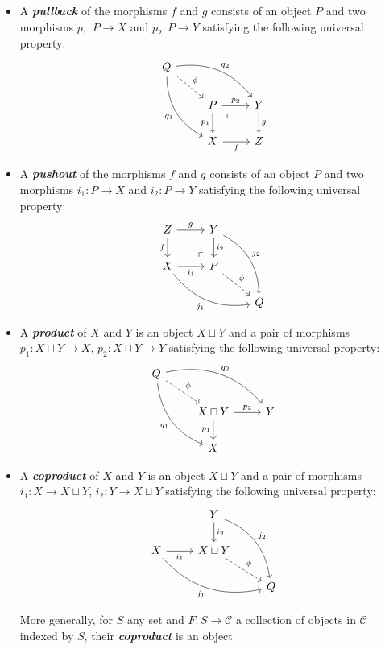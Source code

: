 \documentclass{article}
\numberwithin{equation}{section}
\newcommand{\Cc}{\mathcal{C}}
\begin{document}
\begin{defn}
\begin{itemize}
		\item A \textbf{\textit{pullback}} of the morphisms $f$ and $g$ consists of an object $P$ and two morphisms $p_1:P\to X$ and $p_2:P\to Y$ satisfying the following universal property:
		\[\begin{tikzcd}
			Q\arrow[rrd,bend left,"q_2"]\arrow[ddr,"q_1",swap,bend right]\arrow[dr,dashed,"\phi"]\\
			&P\arrow[r,"p_2"] \arrow[rd, phantom, "\lrcorner", very near start]\arrow[d,"p_1",swap]&Y\arrow[d,"g"]\\
			&X\arrow[r,"f",swap]&Z
		\end{tikzcd}\]
		\item A \textbf{\textit{pushout}} of the morphisms $f$ and $g$ consists of an object $P$ and two morphisms $i_1:P\to X$ and $i_2:P\to Y$ satisfying the following universal property:
		\[\begin{tikzcd}
			Z\arrow[r,"g"]\arrow[d,swap,"f"]&Y\arrow[d,"i_2"]\arrow[ddr,bend left,"j_2"]\\
			X\arrow[r,"i_1",swap]\arrow[drr,bend right,swap,"j_1"]&P\arrow[ul, phantom, "\ulcorner", very near start]\arrow[dr,dashed,"\phi"]\\
			&&Q
		\end{tikzcd}\]
		\item A \textbf{\textit{product}} of $X$ and $Y$ is an object $X\sqcup Y$ and a pair of morphisms $p_1:X\sqcap Y\to X$, $p_2:X\sqcap Y\to Y$ satisfying the following universal property:
		\[\begin{tikzcd}
			Q\arrow[rrd,bend left,"q_2"]\arrow[ddr,"q_1",swap,bend right]\arrow[dr,dashed,"\phi"]\\
			&X\sqcap Y\arrow[r,"p_2"]\arrow[d,"p_1",swap]&Y\\
			&X
		\end{tikzcd}\]
		\item A \textbf{\textit{coproduct}} of $X$ and $Y$ is an object $X\sqcup Y$ and a pair of morphisms $i_1:X\to X\sqcup Y$, $i_2:Y\to X\sqcup Y$ satisfying the following universal property:
		\[\begin{tikzcd}
			&Y\arrow[d,"i_2"]\arrow[ddr,bend left,"j_2"]\\
			X\arrow[r,"i_1",swap]\arrow[drr,bend right,swap,"j_1"]&X\sqcup Y\arrow[dr,dashed,"\phi"]\\
			&&Q
		\end{tikzcd}\]
		\begin{remark}
			More generally, for $S$ any set and $F:S\to\Cc$ a collection of objects in $\Cc$ indexed by $S$, their \textbf{\textit{coproduct}} is an object

\end{remark}
\end{itemize}
\end{defn}
\end{document}

